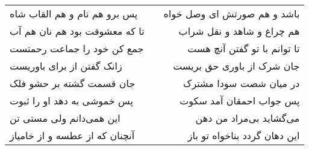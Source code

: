 \begin{center}
\begin{longtable}{l p{0.5cm} r}
\\
پس برو هم نام و هم القاب شاه
&&
باشد و هم صورتش ای وصل خواه
\\
تا که معشوقت بود هم نان هم آب
&&
هم چراغ و شاهد و نقل شراب
\\
جمع کن خود را جماعت رحمتست
&&
تا توانم با تو گفتن آنچ هست
\\
زانک گفتن از برای باوریست
&&
جان شرک از باوری حق بریست
\\
جان قسمت گشته بر حشو فلک
&&
در میان شصت سودا مشترک
\\
پس خموشی به دهد او را ثبوت
&&
پس جواب احمقان آمد سکوت
\\
این همی‌دانم ولی مستی تن
&&
می‌گشاید بی‌مراد من دهن
\\
آنچنان که از عطسه و از خامیاز
&&
این دهان گردد بناخواه تو باز
\\
\end{longtable}
\end{center}
